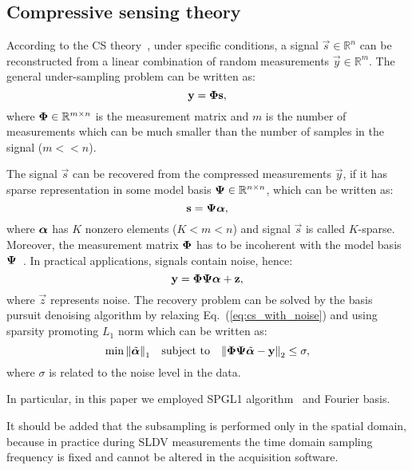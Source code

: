 \subsection{Compressive sensing theory}

According to the CS theory~\cite{Candes2006}, under specific conditions, a signal $\vec{s}\in \mathbb{R}^n$ can be reconstructed from a linear combination of random measurements $\vec{y} \in \mathbb{R}^m$.
The general under-sampling problem can be written as:
\begin{equation}
	\mathbf{y} = \boldsymbol{\Phi} \mathbf{s},
\end{equation}
where $\boldsymbol{\Phi} \in \mathbb{R}^{m\times n}$ is the measurement matrix and $m$ is the number of measurements which can be much smaller than the number of samples in the signal ($m<<n$).

The signal $\vec{s}$ can be recovered from the compressed measurements $\vec{y}$, if it has sparse representation in some model basis $\boldsymbol{\Psi} \in \mathbb{R}^{n\times n}$, which can be written as:
\begin{equation}
	\mathbf{s} = \boldsymbol{\Psi} \boldsymbol{\alpha},
\end{equation}
where $\boldsymbol{\alpha}$ has $K$ nonzero elements ($K<m<n$) and signal $\vec{s}$ is called $K$-sparse. 
Moreover, the measurement matrix $\boldsymbol{\Phi}$ has to be incoherent with the model basis $\boldsymbol{\Psi}$~\cite{Candes2007}.
In practical applications, signals contain noise, hence:
\begin{equation}
	\mathbf{y} = \boldsymbol{\Phi} \boldsymbol{\Psi} \boldsymbol{\alpha} + \mathbf{z},
	\label{eq:cs_with_noise}
\end{equation}
where $\vec{z}$ represents noise.
The recovery problem can be solved by the basis pursuit denoising algorithm by relaxing Eq.~(\ref{eq:cs_with_noise}) and using sparsity promoting $L_1$ norm which can be written as:
\begin{equation}
	\min{\lVert \tilde{\boldsymbol{\alpha}} \rVert}_1 \quad \textrm{subject to} \quad {\lVert \boldsymbol{\Phi} \boldsymbol{\Psi} \tilde{\boldsymbol{\alpha}} -\mathbf{y} \rVert}_2 \leq \sigma ,
\end{equation}
where $\sigma$ is related to the noise level in the data.

In particular, in this paper we employed SPGL1 algorithm~\cite{VandenBerg2019} and Fourier basis.

It should be added that the subsampling is performed only in the spatial domain, because in practice during SLDV measurements the time domain sampling frequency is fixed and cannot be altered in the acquisition software. 